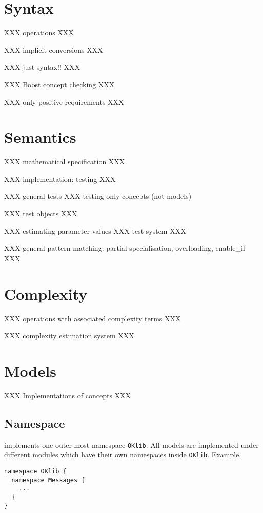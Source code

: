 \documentclass{book}
\newcommand{\name}[1]{\texttt{#1}}
\begin{document}
\section{Syntax}
\label{sec:Syntax}

XXX operations XXX

XXX implicit conversions XXX

XXX just syntax!! XXX

XXX Boost concept checking XXX

XXX only positive requirements XXX

\section{Semantics}
\label{sec:Semantics}

XXX mathematical specification XXX

XXX implementation: testing XXX

XXX general tests XXX testing only concepts (not models)

XXX test objects XXX

XXX estimating parameter values XXX test system XXX

XXX general pattern matching: partial specialisation, overloading, enable\_if XXX

\section{Complexity}
\label{sec:Complexity}

XXX operations with associated complexity terms XXX

XXX complexity estimation system XXX


\section{Models}
\label{sec:Models}

XXX Implementations of concepts XXX

\subsection{Namespace}
\label{subsec:Namespace}

\OKlibrary{} implements one outer-most namespace \name{OKlib}. All models are implemented under different modules which have their own namespaces inside \name{OKlib}. Example, 

\begin{verbatim}
namespace OKlib {
  namespace Messages {
    ...
  }
}
\end{verbatim}
\end{document}
